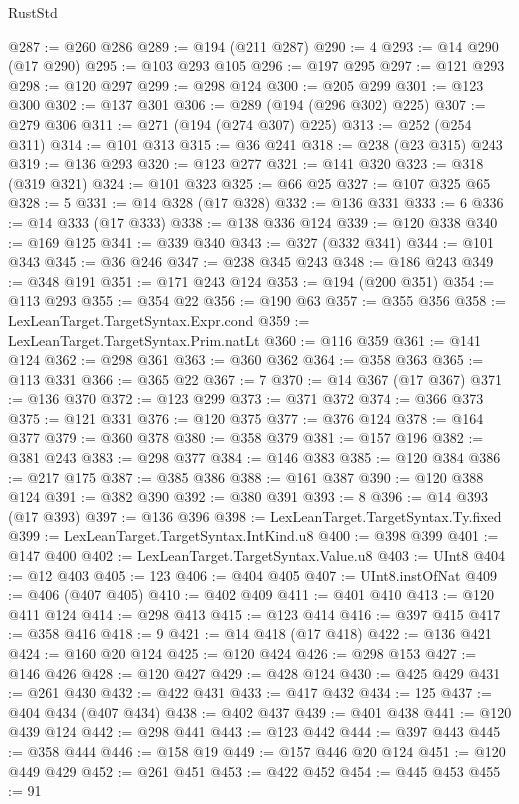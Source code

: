 \begin{lexlean}{RustStd}
\begin{coremodule}
@287 := @260 @286
@289 := @194 (@211 @287)
@290 := 4
@293 := @14 @290 (@17 @290)
@295 := @103 @293 @105
@296 := @197 @295
@297 := @121 @293
@298 := @120 @297
@299 := @298 @124
@300 := @205 @299
@301 := @123 @300
@302 := @137 @301
@306 := @289 (@194 (@296 @302) @225)
@307 := @279 @306
@311 := @271 (@194 (@274 @307) @225)
@313 := @252 (@254 @311)
@314 := @101 @313
@315 := @36 @241
@318 := @238 (@23 @315) @243
@319 := @136 @293
@320 := @123 @277
@321 := @141 @320
@323 := @318 (@319 @321)
@324 := @101 @323
@325 := @66 @25
@327 := @107 @325 @65
@328 := 5
@331 := @14 @328 (@17 @328)
@332 := @136 @331
@333 := 6
@336 := @14 @333 (@17 @333)
@338 := @138 @336 @124
@339 := @120 @338
@340 := @169 @125
@341 := @339 @340
@343 := @327 (@332 @341)
@344 := @101 @343
@345 := @36 @246
@347 := @238 @345 @243
@348 := @186 @243
@349 := @348 @191
@351 := @171 @243 @124
@353 := @194 (@200 @351)
@354 := @113 @293
@355 := @354 @22
@356 := @190 @63
@357 := @355 @356
@358 := LexLeanTarget.TargetSyntax.Expr.cond
@359 := LexLeanTarget.TargetSyntax.Prim.natLt
@360 := @116 @359
@361 := @141 @124
@362 := @298 @361
@363 := @360 @362
@364 := @358 @363
@365 := @113 @331
@366 := @365 @22
@367 := 7
@370 := @14 @367 (@17 @367)
@371 := @136 @370
@372 := @123 @299
@373 := @371 @372
@374 := @366 @373
@375 := @121 @331
@376 := @120 @375
@377 := @376 @124
@378 := @164 @377
@379 := @360 @378
@380 := @358 @379
@381 := @157 @196
@382 := @381 @243
@383 := @298 @377
@384 := @146 @383
@385 := @120 @384
@386 := @217 @175
@387 := @385 @386
@388 := @161 @387
@390 := @120 @388 @124
@391 := @382 @390
@392 := @380 @391
@393 := 8
@396 := @14 @393 (@17 @393)
@397 := @136 @396
@398 := LexLeanTarget.TargetSyntax.Ty.fixed
@399 := LexLeanTarget.TargetSyntax.IntKind.u8
@400 := @398 @399
@401 := @147 @400
@402 := LexLeanTarget.TargetSyntax.Value.u8
@403 := UInt8
@404 := @12 @403
@405 := 123
@406 := @404 @405
@407 := UInt8.instOfNat
@409 := @406 (@407 @405)
@410 := @402 @409
@411 := @401 @410
@413 := @120 @411 @124
@414 := @298 @413
@415 := @123 @414
@416 := @397 @415
@417 := @358 @416
@418 := 9
@421 := @14 @418 (@17 @418)
@422 := @136 @421
@424 := @160 @20 @124
@425 := @120 @424
@426 := @298 @153
@427 := @146 @426
@428 := @120 @427
@429 := @428 @124
@430 := @425 @429
@431 := @261 @430
@432 := @422 @431
@433 := @417 @432
@434 := 125
@437 := @404 @434 (@407 @434)
@438 := @402 @437
@439 := @401 @438
@441 := @120 @439 @124
@442 := @298 @441
@443 := @123 @442
@444 := @397 @443
@445 := @358 @444
@446 := @158 @19
@449 := @157 @446 @20 @124
@451 := @120 @449 @429
@452 := @261 @451
@453 := @422 @452
@454 := @445 @453
@455 := 91

\end{coremodule}
\end{lexlean}
